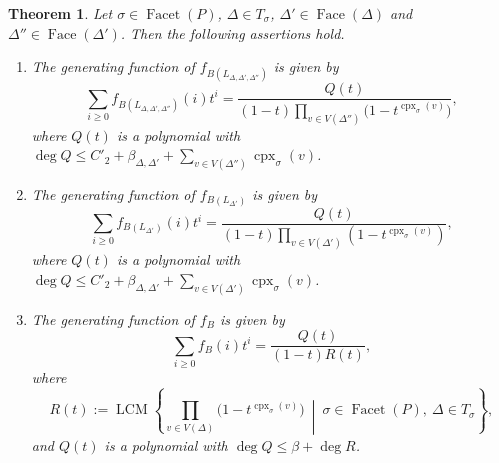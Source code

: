\documentclass[11pt]{article}
\newtheorem{thm}[theo]{Theorem}
\theoremstyle{definition}
\numberwithin{equation}{section}
\begin{document}
\begin{thm}\label{thm:main}
Let $\sigma \in \operatorname{Facet}(P)$, $\Delta \in T_{\sigma}$, 
$\Delta ' \in \operatorname{Face}(\Delta)$ and $\Delta '' \in \operatorname{Face}(\Delta ')$. 
Then the following assertions hold. 

\begin{enumerate}
\item 
The generating function of $f_{B ( L_{\Delta, \Delta ', \Delta''} )}$ is given by 
\[
\sum _{i \ge 0} f_{B ( L_{\Delta, \Delta ', \Delta''} )}(i) t^i = 
\frac{Q(t)}{(1-t) \prod _{v \in V(\Delta '')} \bigl( 1 - t^{\operatorname{cpx}_{\sigma}(v)} \bigr)}, 
\]
where $Q(t)$ is a polynomial with $\deg Q \le C'_2 + \beta _{\Delta, \Delta '} + \sum _{v \in V(\Delta '')} \operatorname{cpx}_{\sigma}(v)$. 

\item 
The generating function of $f_{B ( L_{\Delta '} )}$ is given by 
\[
\sum _{i \ge 0} f_{B ( L_{\Delta '} )}(i) t^i = 
\frac{Q(t)}{(1-t) \prod _{v \in V(\Delta ')} \left( 1 - t^{\operatorname{cpx}_{\sigma}(v)} \right)}, 
\]
where $Q(t)$ is a polynomial with $\deg Q \le C'_2 + \beta _{\Delta, \Delta '} + \sum _{v \in V(\Delta ')} \operatorname{cpx}_{\sigma}(v)$. 

\item 
The generating function of $f_{B}$ is given by 
\[
\sum _{i \ge 0} f_{B}(i) t^i = 
\frac{Q(t)}{(1-t)R(t)}, 
\]
where 
\[
R(t) := \operatorname{LCM} \left\{ \prod _{v \in V(\Delta)} \bigl( 1 - t^{\operatorname{cpx}_{\sigma}(v)} \bigr) \ \middle | \ \sigma \in \operatorname{Facet}(P),\ \Delta \in T_{\sigma} \right \},  
\]
and $Q(t)$ is a polynomial with $\deg Q \le \beta + \deg R$. 
\end{enumerate}
\end{thm}
\end{document}
